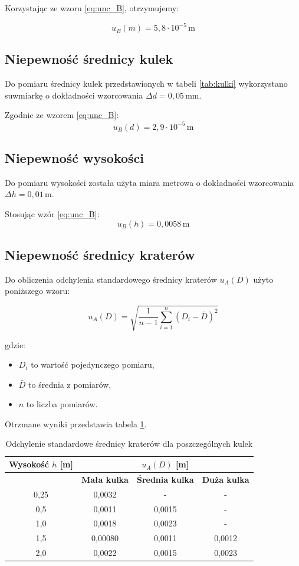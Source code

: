 \documentclass[a4paper,12pt]{article}
\begin{document}
Korzystając ze wzoru \eqref{eq:unc_B}, otrzymujemy:

$$
    u_B(m) = 5,8 \cdot 10^{-5} \, \text{m}
$$

\subsection{Niepewność średnicy kulek}
Do pomiaru średnicy kulek przedstawionych w tabeli \ref{tab:kulki} wykorzystano suwmiarkę o dokładności wzorcowania $\Delta d = 0,05 \, \text{mm}$.

Zgodnie ze wzorem \eqref{eq:unc_B}:
\[
    u_B(d) = 2,9 \cdot 10^{-5} \, \text{m}
\]

\subsection{Niepewność wysokości}
Do pomiaru wysokości została użyta miara metrowa o dokładności wzorcowania $\Delta h = 0,01 \, \text{m}$.

Stosując wzór \eqref{eq:unc_B}:
\[
    u_B(h) = 0,0058 \, \text{m}
\]

\subsection{Niepewność średnicy kraterów}

Do obliczenia odchylenia standardowego średnicy kraterów $u_A(D)$ użyto poniższego wzoru:

\[
    u_A(D) = \sqrt{\frac{1}{n-1} \sum_{i=1}^{n} (D_i - \bar{D})^2}
\]

gdzie:

\begin{itemize}
    \item \( D_i \) to wartość pojedynczego pomiaru,
    \item \( \bar{D} \) to średnia z pomiarów,
    \item \( n \) to liczba pomiarów.
\end{itemize}

Otrzmane wyniki przedstawia tabela \ref{tab:odchylenia_standardowe_srednicy}.

\begin{table}[H]
    \centering
    \begin{tabular}{|c|c|c|c|}
        \hline
        \textbf{Wysokość $h$ [m]} & \multicolumn{3}{c|}{\textbf{$u_A(D)$ [m]}} \\
        \hline
        & \textbf{Mała kulka} & \textbf{Średnia kulka} & \textbf{Duża kulka} \\
        \hline
        0,25 & 0,0032 & - & - \\
        \hline
        0,5  & 0,0011 & 0,0015 & - \\
        \hline
        1,0  & 0,0018 & 0,0023 & - \\
        \hline
        1,5  & 0,00080 & 0,0011 & 0,0012 \\
        \hline
        2,0  & 0,0022 & 0,0015 & 0,0023 \\
        \hline
    \end{tabular}
    \caption{Odchylenie standardowe średnicy kraterów dla poszczególnych kulek}
    \label{tab:odchylenia_standardowe_srednicy}
\end{table}
\end{document}
